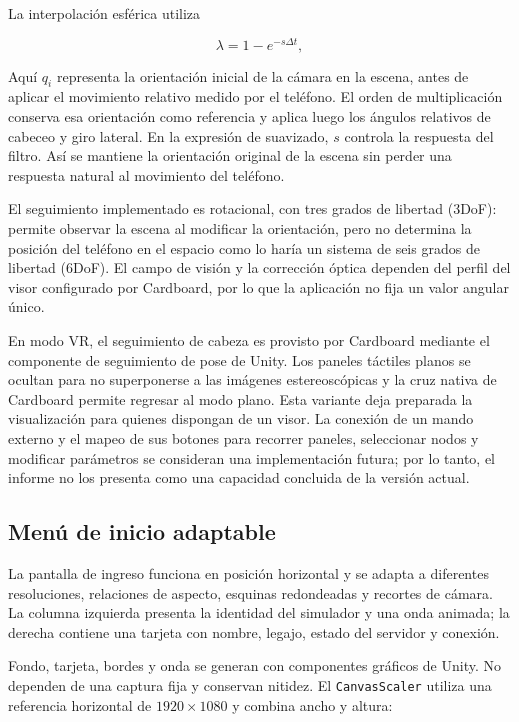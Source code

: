 La interpolación esférica utiliza

\begin{equation}
\lambda=1-e^{-s\Delta t},
\end{equation}

Aquí $q_i$ representa la orientación inicial de la cámara en la escena, antes de aplicar
el movimiento relativo medido por el teléfono. El orden de multiplicación conserva esa
orientación como referencia y aplica luego los ángulos relativos de cabeceo y giro
lateral. En la expresión de suavizado, $s$ controla la respuesta del filtro. Así se
mantiene la orientación original de la escena
sin perder una respuesta natural al movimiento del teléfono.

El seguimiento implementado es rotacional, con tres grados de libertad (3DoF): permite
observar la escena al modificar la orientación, pero no determina la posición del
teléfono en el espacio como lo haría un sistema de seis grados de libertad (6DoF). El
campo de visión y la corrección óptica dependen del perfil del visor configurado por
Cardboard, por lo que la aplicación no fija un valor angular único.

En modo VR, el seguimiento de cabeza es provisto por Cardboard mediante el componente
de seguimiento de pose de Unity. Los paneles táctiles planos se ocultan para no superponerse
a las imágenes estereoscópicas y la cruz nativa de Cardboard permite regresar al modo
plano. Esta variante deja preparada la visualización para quienes dispongan de un visor.
La conexión de un mando externo y el mapeo de sus botones para recorrer paneles,
seleccionar nodos y modificar parámetros se consideran una implementación futura; por
lo tanto, el informe no los presenta como una capacidad concluida de la versión actual.

\subsection{Menú de inicio adaptable}

La pantalla de ingreso funciona en posición horizontal y se adapta a diferentes
resoluciones, relaciones de aspecto, esquinas redondeadas y recortes de cámara. La
columna izquierda presenta la identidad del simulador y una onda animada; la derecha
contiene una tarjeta con nombre, legajo, estado del servidor y conexión.

Fondo, tarjeta, bordes y onda se generan con componentes gráficos de Unity. No dependen
de una captura fija y conservan nitidez. El \texttt{CanvasScaler} utiliza una referencia
horizontal de $1920\times1080$ y combina ancho y altura:

